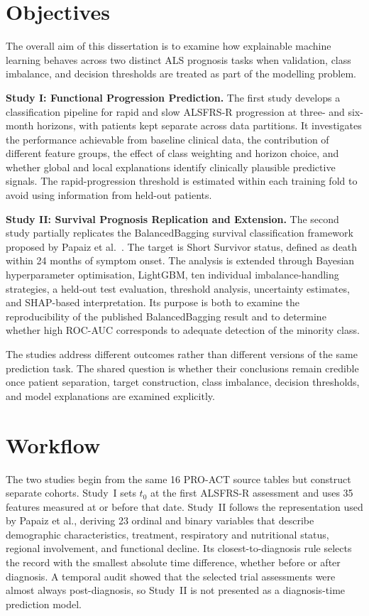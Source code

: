 \section{Objectives}
\label{subsec:objectives}

The overall aim of this dissertation is to examine how explainable machine learning behaves across two distinct ALS prognosis tasks when validation, class imbalance, and decision thresholds are treated as part of the modelling problem.

\textbf{Study I: Functional Progression Prediction.} The first study develops a classification pipeline for rapid and slow \gls{ALSFRS-R} progression at three- and six-month horizons, with patients kept separate across data partitions. It investigates the performance achievable from baseline clinical data, the contribution of different feature groups, the effect of class weighting and horizon choice, and whether global and local explanations identify clinically plausible predictive signals. The rapid-progression threshold is estimated within each training fold to avoid using information from held-out patients.

\textbf{Study II: Survival Prognosis Replication and Extension.} The second study partially replicates the BalancedBagging survival classification framework proposed by Papaiz et al.\ \cite{Papaiz2024}. The target is Short Survivor status, defined as death within 24 months of symptom onset. The analysis is extended through Bayesian hyperparameter optimisation, LightGBM, ten individual imbalance-handling strategies, a held-out test evaluation, threshold analysis, uncertainty estimates, and \gls{SHAP}-based interpretation. Its purpose is both to examine the reproducibility of the published BalancedBagging result and to determine whether high \gls{ROC-AUC} corresponds to adequate detection of the minority class.

The studies address different outcomes rather than different versions of the same prediction task. The shared question is whether their conclusions remain credible once patient separation, target construction, class imbalance, decision thresholds, and model explanations are examined explicitly.

\section{Workflow}
\label{subsec:workflow}

The two studies begin from the same 16 \gls{PRO-ACT} source tables but construct separate cohorts. Study~I sets $t_0$ at the first \gls{ALSFRS-R} assessment and uses 35 features measured at or before that date. Study~II follows the representation used by Papaiz et al., deriving 23 ordinal and binary variables that describe demographic characteristics, treatment, respiratory and nutritional status, regional involvement, and functional decline. Its closest-to-diagnosis rule selects the record with the smallest absolute time difference, whether before or after diagnosis. A temporal audit showed that the selected trial assessments were almost always post-diagnosis, so Study~II is not presented as a diagnosis-time prediction model.

